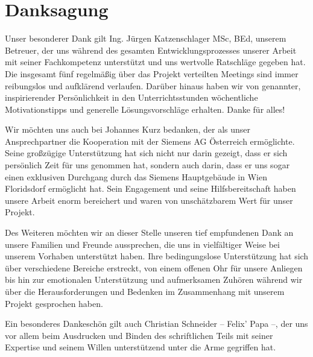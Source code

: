 \section{Danksagung}

Unser besonderer Dank gilt Ing. Jürgen Katzenschlager MSc, BEd, unserem Betreuer, der uns während des gesamten Entwicklungsprozesses unserer Arbeit mit seiner Fachkompetenz unterstützt und uns wertvolle Ratschläge gegeben hat. Die insgesamt fünf regelmäßig über das Projekt verteilten Meetings sind immer reibungslos und aufklärend verlaufen. Darüber hinaus haben wir von genannter, inspirierender Persönlichkeit in den Unterrichtsstunden  wöchentliche Motivationstipps und generelle Lösungsvorschläge erhalten. Danke für alles!

Wir möchten uns auch bei Johannes Kurz bedanken, der als unser Ansprechpartner die Kooperation mit der Siemens AG Österreich ermöglichte. Seine großzügige Unterstützung hat sich nicht nur darin gezeigt, dass er sich persönlich Zeit für uns genommen hat, sondern auch darin, dass er uns sogar einen exklusiven Durchgang durch das Siemens Hauptgebäude in Wien Floridsdorf ermöglicht hat. Sein Engagement und seine Hilfsbereitschaft haben unsere Arbeit enorm bereichert und waren von unschätzbarem Wert für unser Projekt.

Des Weiteren möchten wir an dieser Stelle unseren tief empfundenen Dank an unsere Familien und Freunde aussprechen, die uns in vielfältiger Weise bei unserem Vorhaben unterstützt haben. Ihre bedingungslose Unterstützung hat sich über verschiedene Bereiche erstreckt, von einem offenen Ohr für unsere Anliegen bis hin zur emotionalen Unterstützung und aufmerksamen Zuhören während wir über die Herausforderungen und Bedenken im Zusammenhang mit unserem Projekt gesprochen haben.

Ein besonderes Dankeschön gilt auch Christian Schneider -- Felix' Papa --, der uns vor allem beim Ausdrucken und Binden des schriftlichen Teils mit seiner Expertise und seinem Willen unterstützend unter die Arme gegriffen hat.
